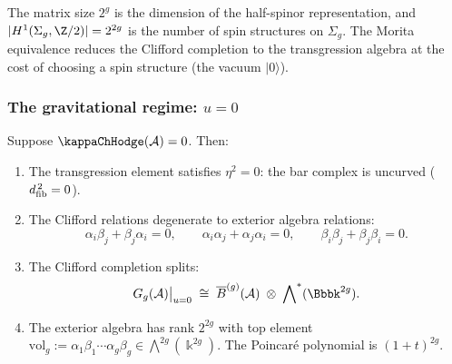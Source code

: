 \begin{remark}
The matrix size $2^g$ is the dimension of the half-spinor
representation, and $|H^1(\Sigma_g, \Z/2)| = 2^{2g}$ is the number of
spin structures on $\Sigma_g$. The Morita equivalence reduces the
Clifford completion to the transgression algebra at the cost of
choosing a spin structure (the vacuum $|0\rangle$).
\end{remark}

\subsubsection{The gravitational regime: $u = 0$}

\begin{theorem}
Suppose $\kappaChHodge(\cA) = 0$. Then:
\begin{enumerate}[label=\textup{(\roman*)}]
\item The transgression element satisfies $\eta^2 = 0$: the
bar complex is uncurved ($d_{\mathrm{fib}}^{\,2} = 0$).

\item The Clifford relations degenerate to exterior algebra relations:
\[
\alpha_i \beta_j + \beta_j \alpha_i = 0,
\qquad
\alpha_i \alpha_j + \alpha_j \alpha_i = 0,
\qquad
\beta_i \beta_j + \beta_j \beta_i = 0.
\]

\item The Clifford completion splits:
\begin{equation}%
G_g(\cA)\big|_{u=0}
\;\cong\;
\barB^{(g)}(\cA)
\;\otimes\; \bigwedge\nolimits^*(\Bbbk^{2g}).
\end{equation}

\item The exterior algebra has rank $2^{2g}$ with top element
$\mathrm{vol}_g := \alpha_1 \beta_1 \cdots \alpha_g \beta_g
\in \bigwedge^{2g}(\Bbbk^{2g})$.
The Poincar\'e polynomial is $(1+t)^{2g}$.
\end{enumerate}
\end{theorem}

